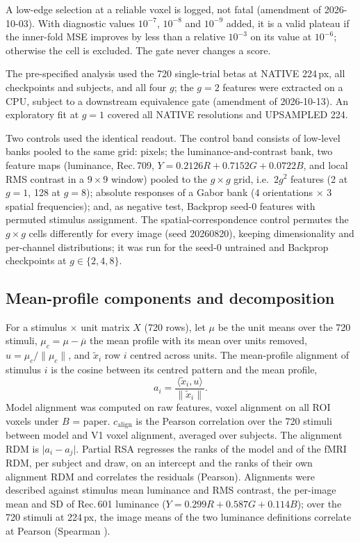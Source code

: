 A low-edge selection at a reliable voxel is logged, not fatal (amendment of 2026-10-03).
With diagnostic values $10^{-7}$, $10^{-8}$ and $10^{-9}$
added, it is a valid plateau if the inner-fold MSE improves by less than a relative
$10^{-3}$ on its value at $10^{-6}$; otherwise the cell is excluded. The gate never
changes a score.

The pre-specified analysis used the 720 single-trial betas at NATIVE 224\,px, all
checkpoints and subjects, and all four $g$; the $g = 2$ features were extracted on a CPU,
subject to a downstream equivalence gate (amendment of 2026-10-13). An exploratory fit
at $g = 1$ covered all NATIVE resolutions and UPSAMPLED 224.

Two controls used the identical readout. The control band consists of low-level banks
pooled to the same grid: pixels; the luminance-and-contrast bank, two feature maps (luminance, Rec.\,709, $Y = 0.2126R + 0.7152G + 0.0722B$, and local RMS contrast in a $9 \times 9$ window) pooled to the $g \times g$ grid, i.e.\ $2g^2$ features (2 at $g = 1$, 128 at $g = 8$); absolute responses of a Gabor bank (4 orientations $\times$
3 spatial frequencies); and, as negative test, Backprop seed-0 features with permuted
stimulus assignment. The spatial-correspondence control permutes the $g \times g$ cells
differently for every image (seed 20260820), keeping dimensionality and per-channel
distributions; it was run for the seed-0 untrained and Backprop checkpoints at
$g \in \{2, 4, 8\}$.

\subsection{Mean-profile components and decomposition}
\label{app:gainmethods}

For a stimulus $\times$ unit matrix $X$ (720 rows), let $\mu$ be the unit means over the 720
stimuli, $\mu_c = \mu - \overline{\mu}$ the mean profile with its mean over units removed,
$u = \mu_c / \lVert \mu_c \rVert$, and $\tilde{x}_i$ row $i$ centred across units. The
mean-profile alignment of stimulus $i$ is the cosine between its centred pattern and the
mean profile,
\begin{equation}
  a_i = \frac{\langle \tilde{x}_i, u \rangle}{\lVert \tilde{x}_i \rVert}.
\end{equation}
Model alignment was computed on raw features, voxel alignment on all ROI voxels under
$B$ = paper. $c_{\mathrm{align}}$ is the Pearson correlation over the 720 stimuli between
model and V1 voxel alignment, averaged over subjects. The alignment RDM is
$\lvert a_i - a_j \rvert$. Partial RSA regresses the ranks of the model and of the fMRI
RDM, per subject and draw, on an intercept and the ranks of their own alignment RDM and
correlates the residuals (Pearson). Alignments were described against stimulus mean
luminance and RMS contrast, the per-image mean and SD of Rec.\,601 luminance
($Y = 0.299R + 0.587G + 0.114B$); over the 720 stimuli at 224\,px, the image means of the
two luminance definitions correlate at Pearson \LumDefPearson{} (Spearman
\LumDefSpearman).

